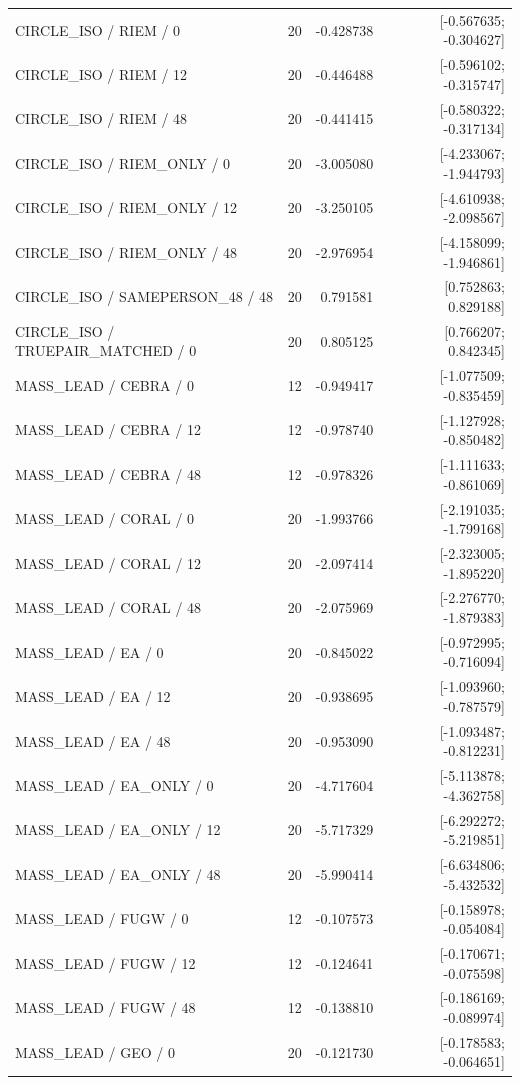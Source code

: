 \begin{longtable}{p{.56\linewidth}rrr}
CIRCLE\_ISO / RIEM / 0 & 20 & -0.428738 & [-0.567635; -0.304627] \\
CIRCLE\_ISO / RIEM / 12 & 20 & -0.446488 & [-0.596102; -0.315747] \\
CIRCLE\_ISO / RIEM / 48 & 20 & -0.441415 & [-0.580322; -0.317134] \\
CIRCLE\_ISO / RIEM\_ONLY / 0 & 20 & -3.005080 & [-4.233067; -1.944793] \\
CIRCLE\_ISO / RIEM\_ONLY / 12 & 20 & -3.250105 & [-4.610938; -2.098567] \\
CIRCLE\_ISO / RIEM\_ONLY / 48 & 20 & -2.976954 & [-4.158099; -1.946861] \\
CIRCLE\_ISO / SAMEPERSON\_48 / 48 & 20 & 0.791581 & [0.752863; 0.829188] \\
CIRCLE\_ISO / TRUEPAIR\_MATCHED / 0 & 20 & 0.805125 & [0.766207; 0.842345] \\
MASS\_LEAD / CEBRA / 0 & 12 & -0.949417 & [-1.077509; -0.835459] \\
MASS\_LEAD / CEBRA / 12 & 12 & -0.978740 & [-1.127928; -0.850482] \\
MASS\_LEAD / CEBRA / 48 & 12 & -0.978326 & [-1.111633; -0.861069] \\
MASS\_LEAD / CORAL / 0 & 20 & -1.993766 & [-2.191035; -1.799168] \\
MASS\_LEAD / CORAL / 12 & 20 & -2.097414 & [-2.323005; -1.895220] \\
MASS\_LEAD / CORAL / 48 & 20 & -2.075969 & [-2.276770; -1.879383] \\
MASS\_LEAD / EA / 0 & 20 & -0.845022 & [-0.972995; -0.716094] \\
MASS\_LEAD / EA / 12 & 20 & -0.938695 & [-1.093960; -0.787579] \\
MASS\_LEAD / EA / 48 & 20 & -0.953090 & [-1.093487; -0.812231] \\
MASS\_LEAD / EA\_ONLY / 0 & 20 & -4.717604 & [-5.113878; -4.362758] \\
MASS\_LEAD / EA\_ONLY / 12 & 20 & -5.717329 & [-6.292272; -5.219851] \\
MASS\_LEAD / EA\_ONLY / 48 & 20 & -5.990414 & [-6.634806; -5.432532] \\
MASS\_LEAD / FUGW / 0 & 12 & -0.107573 & [-0.158978; -0.054084] \\
MASS\_LEAD / FUGW / 12 & 12 & -0.124641 & [-0.170671; -0.075598] \\
MASS\_LEAD / FUGW / 48 & 12 & -0.138810 & [-0.186169; -0.089974] \\
MASS\_LEAD / GEO / 0 & 20 & -0.121730 & [-0.178583; -0.064651] \\

\end{longtable}
